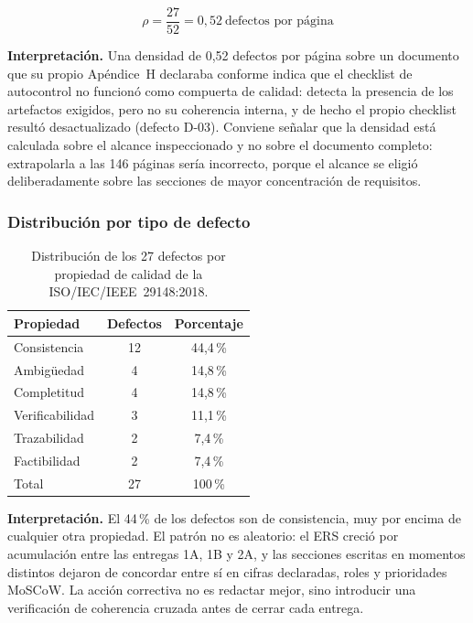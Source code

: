 \documentclass[journal,onecolumn]{IEEEtran}
\begin{document}
	\begin{equation}
		\rho = \frac{27}{52} = 0{,}52 \ \text{defectos por página}
	\end{equation}
	
	\textbf{Interpretación.} Una densidad de 0,52 defectos por página sobre un
	documento que su propio Apéndice~H declaraba conforme indica que el
	checklist de autocontrol no funcionó como compuerta de calidad: detecta la
	presencia de los artefactos exigidos, pero no su coherencia interna, y de
	hecho el propio checklist resultó desactualizado (defecto D-03). Conviene
	señalar que la densidad está calculada sobre el alcance inspeccionado y no
	sobre el documento completo: extrapolarla a las 146 páginas sería
	incorrecto, porque el alcance se eligió deliberadamente sobre las secciones
	de mayor concentración de requisitos.
	
	\subsubsection{Distribución por tipo de defecto}
	
	\begin{table}[h!]
		\centering
		\caption{Distribución de los 27 defectos por propiedad de calidad de la
			ISO/IEC/IEEE~29148:2018.}
		\label{tab:distribucion-tipo}
		\begin{tabular}{l c c}
			\toprule
			\textbf{Propiedad} & \textbf{Defectos} & \textbf{Porcentaje} \\
			\midrule
			Consistencia     & 12 & 44,4\,\% \\
			Ambigüedad       & 4  & 14,8\,\% \\
			Completitud      & 4  & 14,8\,\% \\
			Verificabilidad  & 3  & 11,1\,\% \\
			Trazabilidad     & 2  & 7,4\,\%  \\
			Factibilidad     & 2  & 7,4\,\%  \\
			\midrule
			Total            & 27 & 100\,\%  \\
			\bottomrule
		\end{tabular}
	\end{table}
	
	\textbf{Interpretación.} El 44\,\% de los defectos son de consistencia, muy
	por encima de cualquier otra propiedad. El patrón no es aleatorio: el ERS
	creció por acumulación entre las entregas 1A, 1B y 2A, y las secciones
	escritas en momentos distintos dejaron de concordar entre sí en cifras
	declaradas, roles y prioridades MoSCoW. La acción correctiva no es redactar
	mejor, sino introducir una verificación de coherencia cruzada antes de
	cerrar cada entrega.
	
\end{document}
